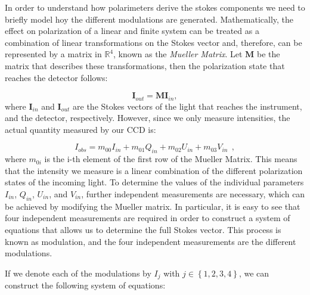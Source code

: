 In order to understand how polarimeters derive the stokes components we need to briefly model hoy the different modulations are generated. Mathematically, the effect on polarization of a linear and finite system can be treated as a combination of linear transformations on the Stokes vector and, therefore, can be represented by a matrix in $\mathbb{R}^4$, known as the \textit{Mueller Matrix}. Let $\textbf{M}$ be the matrix that describes these transformations, then the polarization state that reaches the detector follows:

\begin{equation}
  \textbf{I}_{out} = \textbf{M}\textbf{I}_{in},
  \label{eq_intro:modultaion_eqs}
\end{equation}
where $\textbf{I}_{in}$ and $\textbf{I}_{out}$ are the Stokes vectors of the light that reaches the instrument, and the detector, respectively. However, since we only measure intensities, the actual quantity measured by our CCD is: 

\begin{equation}
  I_{obs} = m_{00}I_{in} + m_{01}Q_{in} + m_{02}U_{in} + m_{03}V_{in} \ \ ,
\end{equation}
where $m_{0i}$ is the i-th element of the first row of the Mueller Matrix. This means that the intensity we measure is a linear combination of the different polarization states of the incoming light. To determine the values of the individual parameters $I_{in}$, $Q_{in}$, $U_{in}$, and $V_{in}$, further independent measurements are necessary, which can be achieved by modifying the Mueller matrix. In particular, it is easy to see that four independent measurements are required in order to construct a system of equations that allows us to determine the full Stokes vector. This process is known as modulation, and the four independent measurements are the different modulations.

If we denote each of the modulations by $I _ j$ with $j \in \left\{ 1, 2, 3, 4\right\}$, we can construct the following system of equations:

